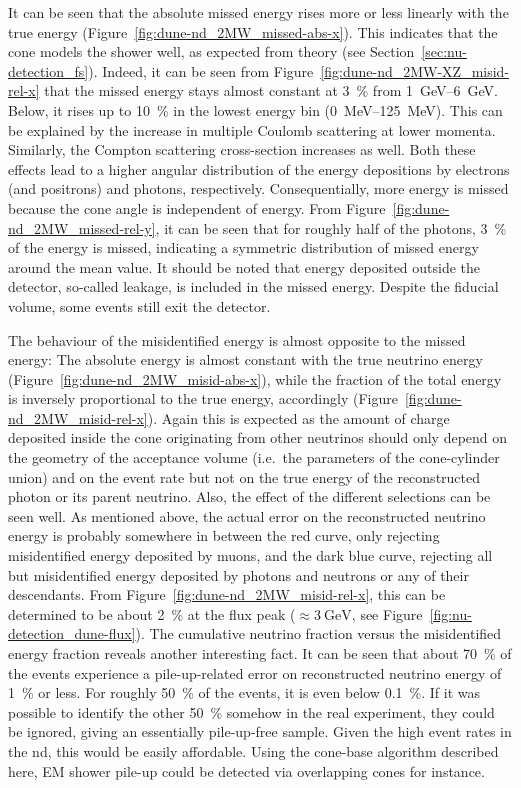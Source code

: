 It can be seen that the absolute missed energy rises more or less linearly with the true energy (Figure~\ref{fig:dune-nd_2MW_missed-abs-x}).
This indicates that the cone models the shower well, as expected from theory (see Section~\ref{sec:nu-detection_fs}).
Indeed, it can be seen from Figure~\ref{fig:dune-nd_2MW-XZ_misid-rel-x} that the missed energy stays almost constant at \SI{3}{\percent} from \SIrange{1}{6}{\giga\electronvolt}.
Below, it rises up to \SI{10}{\percent} in the lowest energy bin (\SIrange{0}{125}{\mega\electronvolt}).
This can be explained by the increase in multiple Coulomb scattering at lower momenta.
Similarly, the Compton scattering cross-section increases as well.
Both these effects lead to a higher angular distribution of the energy depositions by electrons (and positrons) and photons, respectively.
Consequentially, more energy is missed because the cone angle is independent of energy.
From Figure~\ref{fig:dune-nd_2MW_missed-rel-y}, it can be seen that for roughly half of the photons, \SI{3}{\percent} of the energy is missed, indicating a symmetric distribution of missed energy around the mean value.
It should be noted that energy deposited outside the detector, so-called leakage, is included in the missed energy.
Despite the fiducial volume, some events still exit the detector.

The behaviour of the misidentified energy is almost opposite to the missed energy: The absolute energy is almost constant with the true neutrino energy (Figure~\ref{fig:dune-nd_2MW_misid-abs-x}), while the fraction of the total energy is inversely proportional to the true energy, accordingly (Figure~\ref{fig:dune-nd_2MW_misid-rel-x}).
Again this is expected as the amount of charge deposited inside the cone originating from other neutrinos should only depend on the geometry of the acceptance volume (i.e.\ the parameters of the cone-cylinder union) and on the event rate but not on the true energy of the reconstructed photon or its parent neutrino.
Also, the effect of the different selections can be seen well.
As mentioned above, the actual error on the reconstructed neutrino energy is probably somewhere in between the red curve, only rejecting misidentified energy deposited by muons, and the dark blue curve, rejecting all but misidentified energy deposited by photons and neutrons or any of their descendants.
From Figure~\ref{fig:dune-nd_2MW_misid-rel-x}, this can be determined to be about \SI{2}{\percent} at the flux peak ($\approx \SI{3}{\giga\electronvolt}$, see Figure~\ref{fig:nu-detection_dune-flux}).
The cumulative neutrino fraction versus the misidentified energy fraction reveals another interesting fact.
It can be seen that about \SI{70}{\percent} of the events experience a pile-up-related error on reconstructed neutrino energy of \SI{1}{\percent} or less.
For roughly \SI{50}{\percent} of the events, it is even below \SI{0.1}{\percent}.
If it was possible to identify the other \SI{50}{\percent} somehow in the real experiment, they could be ignored, giving an essentially pile-up-free sample.
Given the high event rates in the \gls{nd}, this would be easily affordable.
Using the cone-base algorithm described here, EM shower pile-up could be detected via overlapping cones for instance.

